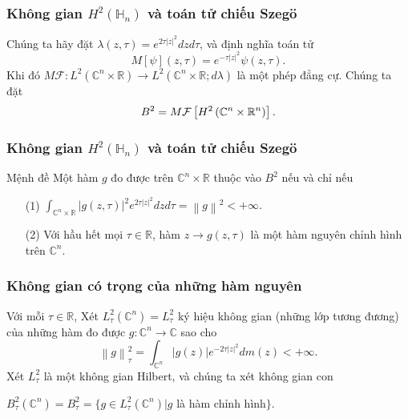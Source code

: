 \documentclass[11pt]{beamer}
\numberwithin{equation}{section}
\theoremstyle{plain}
\theoremstyle{definition}
\theoremstyle{remark}
\begin{document}
\begin{frame}\frametitle{Không gian $H^{2}\left(\mathbb{H}_{n}\right)$ và toán tử chiếu Szeg\"o}
Chúng ta hãy đặt $\lambda\left(z,\tau\right)=e^{2\tau\left|z\right|^{2}}dzd\tau$, và định nghĩa toán tử
\[M\left[ \psi  \right]\left( {z,\tau } \right) = {e^{ - \tau {{\left| z \right|}^2}}}\psi \left( {z,\tau } \right).\]
Khi đó $M\mathcal{F}:L^{2}\left(\mathbb{C}^{n}\times\mathbb{R}\right)\to L^{2}\left(\mathbb{C}^{n}\times\mathbb{R};d\lambda\right)$ là một phép đẳng cự. Chúng ta đặt 
\[{B^2} = M{\cal F}\left[ {{H^2}\left( {{\mathbb{C}^n} \times {\mathbb{R}^n}} \right)} \right].\]
\end{frame}




\begin{frame}\frametitle{Không gian $H^{2}\left(\mathbb{H}_{n}\right)$ và toán tử chiếu Szeg\"o}
\begin{block}{Mệnh đề}
Một hàm $g$ đo được trên $\mathbb{C}^{n}\times\mathbb{R}$ thuộc vào $B^{2}$ nếu và chỉ nếu 
\begin{itemize}
\item[(1)]$\int_{{\mathbb{C}^n} \times\mathbb{R} } {{{\left| {g\left( {z,\tau } \right)} \right|}^2}{e^{2\tau {{\left| z \right|}^2}}}dzd\tau }  = {\left\| g \right\|^2} <  + \infty .$
\item[(2)] Với hầu hết mọi $\tau\in\mathbb{R}$, hàm $z\to g\left(z,\tau\right)$ là một hàm nguyên chỉnh hình trên $\mathbb{C}^{n}$.
\end{itemize}
\end{block}
\end{frame}



\begin{frame}\frametitle{Không gian có trọng của những hàm nguyên}
Với mỗi $\tau\in\mathbb{R}$, Xét $L_\tau ^2\left( {{\mathbb{C}^n}} \right) = L_\tau ^2$ ký hiệu không gian (những lớp tương đương) của những hàm đo được $g:\mathbb{C}^{n}\to\mathbb{C}$ sao cho 
\[\left\| g \right\|_\tau ^2 = \int_{{\mathbb{C}^n}} {\left| {g\left( z \right)} \right|{e^{ - 2\tau {{\left| z \right|}^2}}}dm\left( z \right)}  <  + \infty .\]
Xét $L_\tau^2$ là một không gian Hilbert, và chúng ta xét không gian con
\begin{center}
$B_\tau ^2\left( {{\mathbb{C}^n}} \right) = B_\tau ^2 = \{ g \in L_\tau ^2\left( {{\mathbb{C}^n}} \right)|g$ là hàm chỉnh hình$\}$.
\end{center}
\end{frame}
\end{document}
